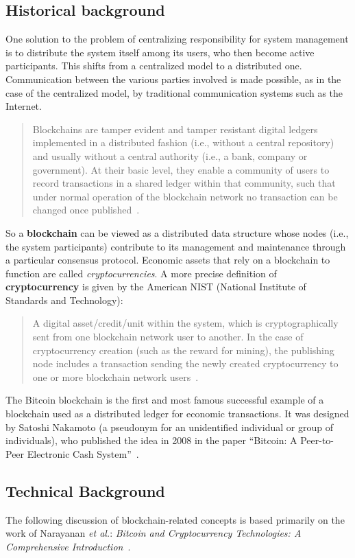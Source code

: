 \documentclass[conference]{IEEEtran}
\begin{document}
\subsection{Historical background}
One solution to the problem of centralizing responsibility for system management is to distribute the system itself among its users, who then become active participants. This shifts from a centralized model to a distributed one. Communication between the various parties involved is made possible, as in the case of the centralized model, by traditional communication systems such as the Internet.\\
\begin{quote}
Blockchains are tamper evident and tamper resistant digital ledgers implemented in a distributed fashion (i.e., without a central repository) and usually without a central authority (i.e., a bank, company or government). At their basic level, they enable a community of users to record transactions in a shared ledger within that community, such that under normal operation of the blockchain network no transaction can be changed once published~\cite{blockchain_nist_definition}.
\end{quote}
So a \textbf{blockchain} can be viewed as a distributed data structure whose nodes (i.e., the system participants) contribute to its management and maintenance through a particular consensus protocol. Economic assets that rely on a blockchain to function are called \textit{cryptocurrencies}. A more precise definition of \textbf{cryptocurrency} is given by the American NIST (National Institute of Standards and Technology):
\begin{quote}
A digital asset/credit/unit within the system, which is cryptographically sent from one blockchain network user to another. In the case of cryptocurrency creation (such as the reward for mining), the publishing node includes a transaction sending the newly created cryptocurrency to one or more blockchain network users~\cite{blockchain_nist_definition}.
\end{quote}
The Bitcoin blockchain is the first and most famous successful example of a blockchain used as a distributed ledger for economic transactions. It was designed by Satoshi Nakamoto (a pseudonym for an unidentified individual or group of individuals), who published the idea in 2008 in the paper ``Bitcoin: A Peer-to-Peer Electronic Cash System''~\cite{bitcoin_paper}.

\subsection{Technical Background}
The following discussion of blockchain-related concepts is based primarily on the work of Narayanan \emph{et al.}: \emph{Bitcoin and Cryptocurrency Technologies: A Comprehensive Introduction}~\cite{bitcoin_narayanan}.
\end{document}
